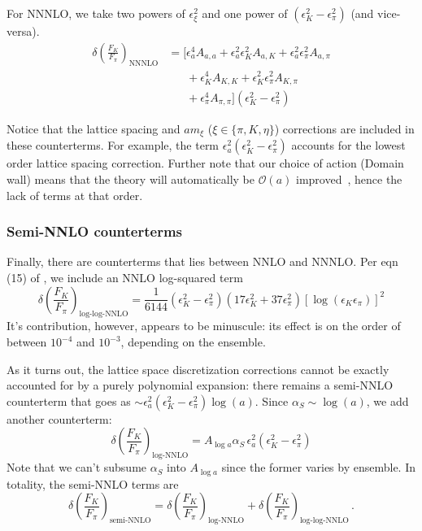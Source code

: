 \documentclass[prd,tightenlines,preprintnumbers,showpacs,superscriptaddress,notitlepage,eqsecnum,floatfix,notitlepage]{revtex4-1}
\begin{document}
For NNNLO, we take two powers of $\epsilon^2_\xi$ and one power of $(\epsilon_K^2 - \epsilon_\pi^2)$ (and vice-versa).
\begin{align}
\delta\left(\frac{F_K}{F_\pi}\right)_\text{NNNLO} &= \bigg[
\epsilon_a^4  A_{a, a} + \epsilon_a^2 \epsilon_K^2  A_{a, K} + \epsilon_a^2 \epsilon_\pi^2  A_{a, \pi} \\ \nonumber
&\phantom{[ =} + \epsilon_K^4  A_{K, K} + \epsilon_K^2 \epsilon_\pi^2  A_{K, \pi} \\ \nonumber
&\phantom{[ =} + \epsilon_\pi^4  A_{\pi, \pi} \bigg] (\epsilon_K^2 - \epsilon_\pi^2)
\end{align}

Notice that the lattice spacing and $am_\xi$ ($\xi \in \{\pi, K, \eta\}$) corrections are included in these counterterms. For example, the term $\epsilon^2_a (\epsilon^2_K - \epsilon^2_\pi)$ accounts for the lowest order lattice spacing correction. Further note that our choice of action (Domain wall) means that the theory will automatically be $\mathcal{O}(a)$ improved~\cite{Berkowitz:2017opd}, hence the lack of terms at that order.

\subsubsection{Semi-NNLO counterterms}
Finally, there are counterterms that lies between NNLO and NNNLO. Per eqn (15) of \cite{Beane:2006kx}, we include an NNLO log-squared term
\begin{equation}
\delta\left(\frac{F_K}{F_\pi}\right)_\text{log-log-NNLO} =
\frac{1}{6144} \left( \epsilon_K^2 - \epsilon_\pi^2 \right) \left( 17 \epsilon_K^2 + 37 \epsilon_\pi^2 \right) \left[\log \left(\epsilon_K \epsilon_\pi \right) \right]^2
\end{equation}
It's contribution, however, appears to be minuscule: its effect is on the order of between $10^{-4}$ and $10^{-3}$, depending on the ensemble.

As it turns out, the lattice space discretization corrections cannot be exactly accounted for by a purely polynomial expansion: there remains a semi-NNLO counterterm that goes as $\sim \epsilon_a^2 (\epsilon_K^2 - \epsilon_\pi^2) \log(a)$. Since $\alpha_S \sim \log(a)$, we add another counterterm:
\begin{equation}
\delta\left(\frac{F_K}{F_\pi}\right)_{\text{log-NNLO}} =
A_{\log a} \alpha_S \, \epsilon_a^2  (\epsilon_K^2 - \epsilon_\pi^2)
\end{equation}
Note that we can't subsume $\alpha_S$ into $A_{\log a}$ since the former varies by ensemble. In totality, the semi-NNLO terms are
\begin{equation}
\delta\left(\frac{F_K}{F_\pi}\right)_{\text{semi-NNLO}} =
\delta\left(\frac{F_K}{F_\pi}\right)_{\text{log-NNLO}}
+ \delta\left(\frac{F_K}{F_\pi}\right)_{\text{log-log-NNLO}}\, .
\end{equation}
\end{document}
